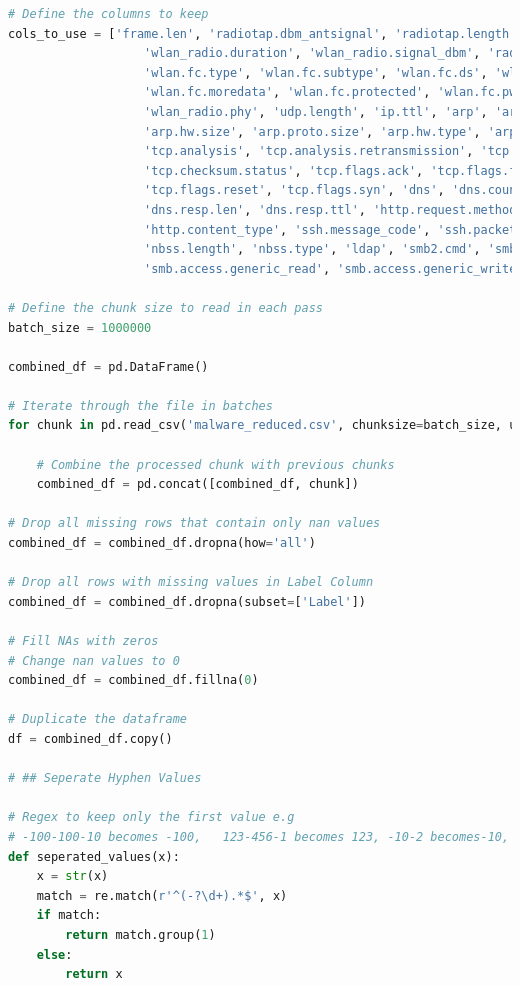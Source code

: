\begin{appendices}
\begin{lstlisting}[language=Python]
# Define the columns to keep
cols_to_use = ['frame.len', 'radiotap.dbm_antsignal', 'radiotap.length', 'wlan.duration',
                   'wlan_radio.duration', 'wlan_radio.signal_dbm', 'radiotap.present.tsft',
                   'wlan.fc.type', 'wlan.fc.subtype', 'wlan.fc.ds', 'wlan.fc.frag',
                   'wlan.fc.moredata', 'wlan.fc.protected', 'wlan.fc.pwrmgt', 'wlan.fc.retry',
                   'wlan_radio.phy', 'udp.length', 'ip.ttl', 'arp', 'arp.proto.type',
                   'arp.hw.size', 'arp.proto.size', 'arp.hw.type', 'arp.opcode',
                   'tcp.analysis', 'tcp.analysis.retransmission', 'tcp.option_len',
                   'tcp.checksum.status', 'tcp.flags.ack', 'tcp.flags.fin', 'tcp.flags.push',
                   'tcp.flags.reset', 'tcp.flags.syn', 'dns', 'dns.count.queries', 'dns.count.answers',
                   'dns.resp.len', 'dns.resp.ttl', 'http.request.method', 'http.response.code',
                   'http.content_type', 'ssh.message_code', 'ssh.packet_length', 'nbns',
                   'nbss.length', 'nbss.type', 'ldap', 'smb2.cmd', 'smb.flags.response',
                   'smb.access.generic_read', 'smb.access.generic_write', 'smb.access.generic_execute','Label']

# Define the chunk size to read in each pass
batch_size = 1000000

combined_df = pd.DataFrame()

# Iterate through the file in batches
for chunk in pd.read_csv('malware_reduced.csv', chunksize=batch_size, usecols=cols_to_use, low_memory=False):
    
    # Combine the processed chunk with previous chunks
    combined_df = pd.concat([combined_df, chunk])

# Drop all missing rows that contain only nan values
combined_df = combined_df.dropna(how='all')

# Drop all rows with missing values in Label Column
combined_df = combined_df.dropna(subset=['Label'])

# Fill NAs with zeros
# Change nan values to 0
combined_df = combined_df.fillna(0)

# Duplicate the dataframe
df = combined_df.copy()

# ## Seperate Hyphen Values

# Regex to keep only the first value e.g 
# -100-100-10 becomes -100,   123-456-1 becomes 123, -10-2 becomes-10, 81-63-63 becomes 81
def seperated_values(x):
    x = str(x)
    match = re.match(r'^(-?\d+).*$', x)
    if match:
        return match.group(1)
    else:
        return x


\end{lstlisting}
\end{appendices}
